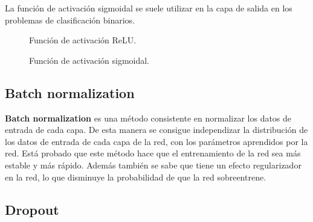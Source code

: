 La función de activación sigmoidal se suele utilizar en la capa de salida en los problemas de clasificación binarios.

\begin{figure}[h]
\noindent
{}
\caption{Función de activación ReLU.}
\label{fig:ejemplos_activacion_relu}
\end{figure}

\begin{figure}[h]
\noindent
{}
\caption{Función de activación sigmoidal.}
\label{fig:ejemplos_activacion_sigmoidal}
\end{figure}



\subsection*{Batch normalization}

\textbf{Batch normalization} \cite{ioffe2015batch} es una método consistente en normalizar los datos de entrada de cada capa. De esta manera se consigue independizar la distribución de los datos de entrada de cada capa de la red, con los parámetros aprendidos por la red. Está probado que este método hace que el entrenamiento de la red sea más estable y más rápido. Además también se sabe que tiene un efecto regularizador en la red, lo que disminuye la probabilidad de que la red sobreentrene.

\subsection*{Dropout}

